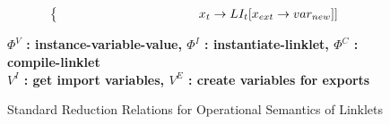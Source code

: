 \begin{figure}[!htbp]
{\begin{minipage}{0.93\textwidth}
\begin{align*}
\begin{cases*}
            \;        &\; \hspace{3.2cm} $x_t\rightarrow LI_t[x_{ext}\rightarrow var_{new}]]$
        \end{cases*} \\
      \end{align*}
    \end{minipage}%
  }
  \vspace{0.6em}
  \begin{center}
    \textbf{
      $\Phi^V$ : instance-variable-value, \quad
      $\Phi^I$ : instantiate-linklet, \quad
      $\Phi^C$ : compile-linklet\\
      $V^I$ : get import variables, \quad
      $V^E$ : create variables for exports
    }
  \end{center}
  \caption{Standard Reduction Relations for Operational Semantics of Linklets}
  \label{fig:linklets-reduction-relation}
\end{figure}



